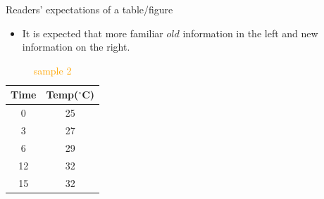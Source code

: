 \documentclass[
 size=14pt,
 paper=smartboard,  %
 mode=present, 		%
 display=slides, 	%
 style=tuliplab,  	%
 pauseslide,
 fleqn,leqno]{powerdot}{}
\begin{document}
\begin{slide}[toc=,bm=]{Readers’ expectations of a table/figure}
	\begin{itemize}
		\item It is expected that more familiar \(old\) information in the left and new information on the right.
	\end{itemize}

{
	\begin{table}
	\fontsize{11pt}{11pt}\selectfont
	\setlength{\abovecaptionskip}{0pt}
	\setlength{\belowcaptionskip}{12pt}
	\centering
	\caption{\textcolor{orange}{sample 2}}
		\begin{tabular}{c|c}
				\toprule
				 \textbf{Time} & \textbf{Temp($^\circ$C)}\\ 
				\midrule
				 0  & 25 \\
				 3  & 27 \\
				 6  & 29 \\
				 12  & 32 \\
				 15  & 32 \\
				\bottomrule
		\end{tabular}
	\end{table}
}
\end{slide}


\end{document}
